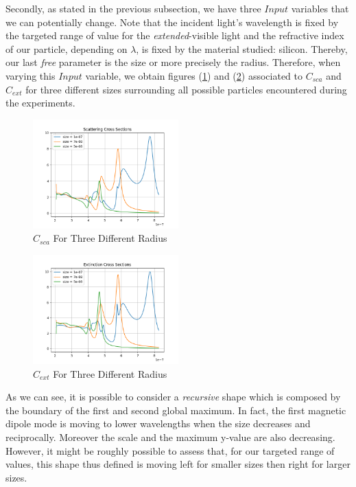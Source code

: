 \documentclass{article}
\numberwithin{equation}{section}
\begin{document}
Secondly, as stated in the previous subsection, we have three $Input$ variables that we can potentially change. Note that the incident light's wavelength is fixed by the targeted range of value for the \textit{extended}-visible light and the refractive index of our particle, depending on $\lambda$, is fixed by the material studied: silicon. Thereby, our last \textit{free} parameter is the size or more precisely the radius. Therefore, when varying this $Input$ variable, we obtain figures (\ref{fig:sca_var}) and (\ref{fig:ext_var}) associated to $C_{sca}$ and $C_{ext}$ for three different sizes surrounding all possible particles encountered during the experiments.
\begin{figure}[h!]
    \centering
    \includegraphics[width=0.5\textwidth, height=0.4\textwidth]{sca_var.png}
    \caption{$C_{sca}$ For Three Different Radius}
    \label{fig:sca_var}
\end{figure}
\begin{figure}[h!]
    \centering
    \includegraphics[width=0.5\textwidth, height=0.4\textwidth]{ext_var.png}
    \caption{$C_{ext}$ For Three Different Radius}
    \label{fig:ext_var}
\end{figure}
As we can see, it is possible to consider a \textit{recursive} shape which is composed by the boundary of the first and second global maximum. In fact, the first magnetic dipole mode is moving to lower wavelengths when the size decreases and reciprocally. Moreover the scale and the maximum y-value are also decreasing. However, it might be roughly possible to assess that, for our targeted range of values, this shape thus defined is moving left for smaller sizes then right for larger sizes.
\end{document}
